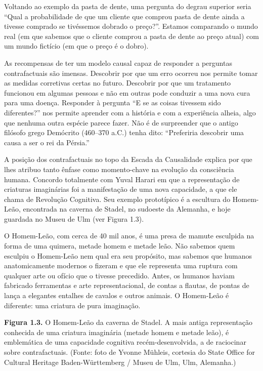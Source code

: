 \documentclass[11pt,a5paper,twoside]{book}
\begin{document}
Voltando ao exemplo da pasta de dente, uma pergunta do degrau superior seria “Qual a probabilidade de que um cliente que comprou pasta de dente ainda a tivesse comprado se tivéssemos dobrado o preço?”. Estamos comparando o mundo real (em que sabemos que o cliente comprou a pasta de dente ao preço atual) com um mundo fictício (em que o preço é o dobro).

As recompensas de ter um modelo causal capaz de responder a perguntas contrafactuais são imensas. Descobrir por que um erro ocorreu nos permite tomar as medidas corretivas certas no futuro. Descobrir por que um tratamento funcionou em algumas pessoas e não em outras pode conduzir a uma nova cura para uma doença. Responder à pergunta “E se as coisas tivessem sido diferentes?” nos permite aprender com a história e com a experiência alheia, algo que nenhuma outra espécie parece fazer. Não é de surpreender que o antigo filósofo grego Demócrito (460–370 a.C.) tenha dito: “Preferiria descobrir uma causa a ser o rei da Pérsia.”

A posição dos contrafactuais no topo da Escada da Causalidade explica por que lhes atribuo tanto ênfase como momento-chave na evolução da consciência humana. Concordo totalmente com Yuval Harari em que a representação de criaturas imaginárias foi a manifestação de uma nova capacidade, a que ele chama de Revolução Cognitiva. Seu exemplo prototípico é a escultura do Homem-Leão, encontrada na caverna de Stadel, no sudoeste da Alemanha, e hoje guardada no Museu de Ulm (ver Figura 1.3).

O Homem-Leão, com cerca de 40 mil anos, é uma presa de mamute esculpida na forma de uma quimera, metade homem e metade leão. Não sabemos quem esculpiu o Homem-Leão nem qual era seu propósito, mas sabemos que humanos anatomicamente modernos o fizeram e que ele representa uma ruptura com qualquer arte ou ofício que o tivesse precedido. Antes, os humanos haviam fabricado ferramentas e arte representacional, de contas a flautas, de pontas de lança a elegantes entalhes de cavalos e outros animais. O Homem-Leão é diferente: uma criatura de pura imaginação.

\textbf{Figura 1.3.} O Homem-Leão da caverna de Stadel. A mais antiga representação conhecida de uma criatura imaginária (metade homem e metade leão), é emblemática de uma capacidade cognitiva recém-desenvolvida, a de raciocinar sobre contrafactuais. (Fonte: foto de Yvonne Mühleis, cortesia do State Office for Cultural Heritage Baden-Württemberg / Museu de Ulm, Ulm, Alemanha.)
\end{document}
